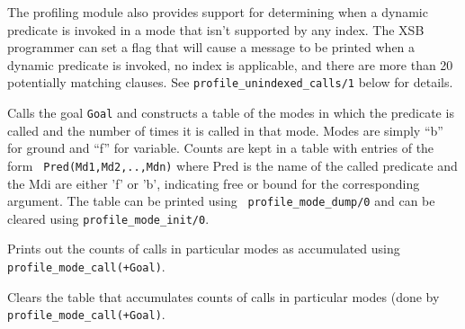 The profiling module also provides support for determining when a
dynamic predicate is invoked in a mode that isn't supported by any
index.  The XSB programmer can set a flag that will cause a message to
be printed when a dynamic predicate is invoked, no index is
applicable, and there are more than 20 potentially matching clauses.
See {\tt profile\_unindexed\_calls/1} below for details.

\begin{description}

Calls the goal {\tt Goal} and constructs a table of the modes in which
the predicate is called and the number of times it is called in that
mode.  Modes are simply ``b'' for ground and ``f'' for variable.
Counts are kept in a table with entries of the form {\tt
Pred(Md1,Md2,..,Mdn)} where Pred is the name of the called predicate
and the Mdi are either 'f' or 'b', indicating free or bound for the
corresponding argument.  The table can be printed using {\tt
profile\_mode\_dump/0} and can be cleared using {\tt profile\_mode\_init/0}.
\end{description}

\begin{description}

Prints out the counts of calls in particular modes as accumulated using \\
{\tt profile\_mode\_call(+Goal)}.
\end{description}

\begin{description}

Clears the table that accumulates counts of calls in particular modes
(done by\\ {\tt profile\_mode\_call(+Goal)}.
\end{description}

